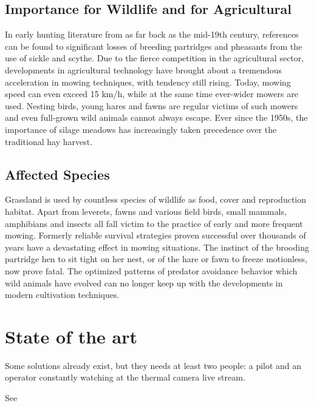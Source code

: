 \subsection{Importance for Wildlife and for Agricultural}
In early hunting literature from as far back as the mid-19th century, references can be found to significant losses of breeding partridges and pheasants from the use of sickle and scythe. Due to the fierce competition in the agricultural sector, developments in agricultural technology have brought about a tremendous acceleration in mowing techniques, with tendency still rising. Today, mowing speed can even exceed 15 km/h, while at the same time ever-wider mowers are used. Nesting birds, young hares and fawns are regular victims of such mowers and even full-grown wild animals cannot always escape. Ever since the 1950s, the importance of silage meadows has increasingly taken precedence over the traditional hay harvest.

\subsection{Affected Species} %
\label{sub:affected_species}
Grassland is used by countless species of wildlife as food, cover and reproduction habitat. Apart from leverets, fawns and various field birds, small mammals, amphibians and insects all fall victim to the practice of early and more frequent mowing. Formerly reliable survival strategies proven successful over thousands of years have a devastating effect in mowing situations. The instinct of the brooding partridge hen to sit tight on her nest, or of the hare or fawn to freeze motionless, now prove fatal. The optimized patterns of predator avoidance behavior which wild animals have evolved can no longer keep up with the developments in modern cultivation techniques.


\section{State of the art} %
\label{sec:state_of_the_art}

Some solutions already exist, but they needs at least two people: a pilot and an operator constantly watching at the thermal camera live stream.

\lipsum[47]

See \cite{KJ:2016}



